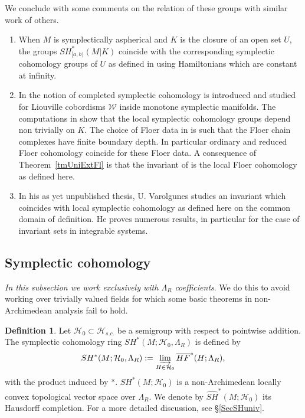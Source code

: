 \documentclass[11pt]{amsart}
\theoremstyle{definition}
\newtheorem{df}[tm]{Definition}
\theoremstyle{remark}
\begin{document}
We conclude with some comments on the relation of these groups with similar work of others.
\begin{enumerate}[wide, labelwidth=!, labelindent=10pt]
\item When $M$ is symplectically aspherical and $K$ is the closure of an open set $U$, the  groups $SH^*_{[a,b)}(M|K)$ coincide with the corresponding symplectic cohomology groups of $U$ as defined in \cite{CielFloerHofer} using Hamiltonians which are constant at infinity.
\item In \cite{Venkatesh2017} the notion of completed symplectic cohomology is introduced and studied for Liouville cobordisms $\mathcal{W}$ inside monotone symplectic manifolds. The computations in \cite{Venkatesh2017} show that the local symplectic cohomology groups depend non trivially on $K$. The choice of Floer data in \cite{Venkatesh2017} is such that the Floer chain complexes have finite boundary depth. In particular ordinary and reduced Floer cohomology coincide for these Floer data.  A consequence of Theorem~\ref{tmUniExtFl} is that the invariant of \cite{Venkatesh2017} is the local Floer cohomology as defined here.
\item In his as yet unpublished thesis, U. Varolgunes studies an invariant which coincides with local symplectic cohomology as defined here on the common domain of definition. He proves numerous results, in particular for the case of invariant sets in integrable systems.
\end{enumerate}
\subsection{Symplectic cohomology}
\textit{In this subsection we work exclusively with $\Lambda_R$ coefficients}. We do this to avoid working over trivially valued fields for which some basic theorems in non-Archimedean analysis fail to hold.

\begin{df}
Let $\mathcal{H}_0\subset\mathcal{H}_{s.c.}$ be a semigroup with respect to pointwise addition. The symplectic cohomology ring $SH^*(M;\mathcal{H}_0,\Lambda_R)$ is defined by
\[
SH^*(M;\mathcal{H}_0,\Lambda_R):=\varinjlim_{H\in\mathcal{H}_0}\overline{HF}^*(H;\Lambda_R),
\]
with the product induced by $*$. $SH^*(M;\mathcal{H}_0)$ is a non-Archimedean locally convex topological vector space over $\Lambda_R$. We denote by $\widehat{SH}^*(M;\mathcal{H}_0)$ its Hausdorff completion. For a more detailed discussion, see \S\ref{SecSHuniv}.
\end{df}
\end{document}
